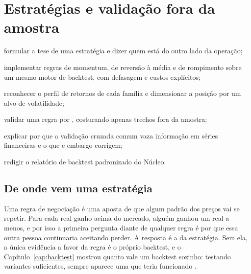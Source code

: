 \chapter{Estratégias e validação fora da amostra}
\label{cap:estrategias}


\begin{objetivos}
  \item formular a tese de uma estratégia e dizer quem está do outro lado da operação;
  \item implementar regras de momentum, de reversão à média e de rompimento sobre um mesmo motor de backtest, com defasagem e custos explícitos;
  \item reconhecer o perfil de retornos de cada família e dimensionar a posição por um alvo de volatilidade;
  \item validar uma regra por , costurando apenas trechos fora da amostra;
  \item explicar por que a validação cruzada comum vaza informação em séries financeiras e o que  e embargo corrigem;
  \item redigir o relatório de backtest padronizado do Núcleo.
\end{objetivos}

\section{De onde vem uma estratégia}
\label{sec:c11-tese}

Uma regra de negociação é uma aposta de que algum padrão dos preços vai se repetir. Para cada real ganho acima do mercado, alguém ganhou um real a menos, e por isso a primeira pergunta diante de qualquer regra é por que essa outra pessoa continuaria aceitando perder. A resposta é a  da estratégia. Sem ela, a única evidência a favor da regra é o próprio backtest, e o Capítulo~\ref{cap:backtest} mostrou quanto vale um backtest sozinho: testando variantes suficientes, sempre aparece uma que teria funcionado \citep{bailey2014pseudo}.

